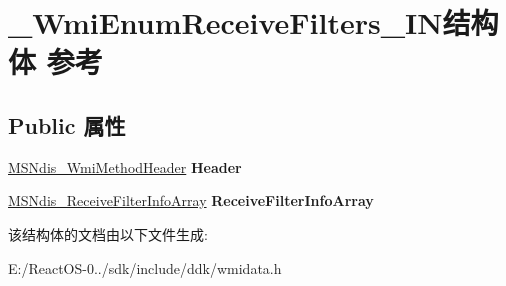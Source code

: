\hypertarget{struct___wmi_enum_receive_filters___i_n}{}\section{\+\_\+\+Wmi\+Enum\+Receive\+Filters\+\_\+\+I\+N结构体 参考}
\label{struct___wmi_enum_receive_filters___i_n}
\subsection*{Public 属性}
\begin{DoxyCompactItemize}
\item 
\mbox{\label{struct___wmi_enum_receive_filters___i_n_a85c6ad2f0840a9bf9dd3a691ef030f54}} 
\hyperlink{struct___m_s_ndis___wmi_method_header}{M\+S\+Ndis\+\_\+\+Wmi\+Method\+Header} {\bfseries Header}
\item 
\mbox{\label{struct___wmi_enum_receive_filters___i_n_a16bae501696160386bbda339b699d50b}} 
\hyperlink{struct___m_s_ndis___receive_filter_info_array}{M\+S\+Ndis\+\_\+\+Receive\+Filter\+Info\+Array} {\bfseries Receive\+Filter\+Info\+Array}
\end{DoxyCompactItemize}


该结构体的文档由以下文件生成\+:\begin{DoxyCompactItemize}
\item 
E\+:/\+React\+O\+S-\/0../sdk/include/ddk/wmidata.\+h\end{DoxyCompactItemize}
